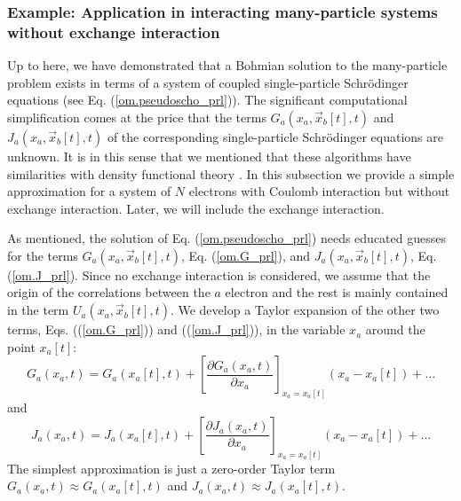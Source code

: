 \documentclass[onecolumn,nofootinbib, secnumarabic, amsmath, nobibnotes,12pt,aps,pra]{revtex4-1}
\newcommand{\pref}[1]{(\ref{#1})}
\newcommand{\eref}[1]{Eq. (\ref{#1})}
\begin{document}
\subsubsection{Example: Application in interacting many-particle systems without exchange interaction}

Up to here, we have demonstrated that a Bohmian solution to the
many-particle problem exists in terms of a system of coupled
single-particle Schr\"odinger equations (see
\eref{om.pseudoscho_prl}). The significant computational
simplification comes at the price that the terms
\textit{$G_{a}(x_{a},\vec x_{b}[t],t)$} and
\textit{$J_{a}(x_{a},\vec x_{b}[t],t)$} of the corresponding
single-particle Schr\"odinger equations are unknown. It is in this
sense that we mentioned that these algorithms have similarities with
density functional theory \cite{om.kohn1964,om.kohn1965}. In this
subsection we provide a simple approximation for a system of $N$
electrons with Coulomb interaction but without exchange interaction.
Later, we will include the exchange interaction.

As mentioned, the solution of \eref{om.pseudoscho_prl} needs
educated guesses for the terms \textit{$G_{a}(x_{a},\vec
x_{b}[t],t)$}, \eref{om.G_prl}, and \textit{$J_{a}(x_{a},\vec
x_{b}[t],t)$}, \eref{om.J_prl}. Since no exchange interaction is
considered, we assume that the origin of the correlations between the $a$ electron and the rest is
mainly contained in the term \textit{$U_{a}(x_{a},\vec
x_{b}[t],t)$}. We develop  a Taylor expansion of the other two terms, Eqs.
(\pref{om.G_prl}) and (\pref{om.J_prl}), in the variable $x_a$
around the point $x_a[t]$:
\begin{equation}
\label{om.G_prl_taylor}
G_{a}(x_a,t) = G_{a}(x_a[t],t) + \left[\frac {\partial G_{a}(x_a,t)} {\partial x_a} \right]_{x_a = x_a[t]}(x_a-x_a[t]) + \ldots
\end{equation}
and
\begin{equation}
\label{om.J_prl_taylor}
J_{a}(x_a,t) = J_{a}(x_a[t],t) + \left[\frac {\partial J_{a}(x_a,t)} {\partial x_a}\right]_{x_a = x_a[t]} (x_a-x_a[t]) + \ldots
\end{equation}
The simplest approximation is just a zero-order Taylor term \textit{$G_{a}(x_a,t) \approx G_{a}(x_a[t],t)$} and \textit{$J_{a}(x_a,t) \approx J_{a}(x_a[t],t)$}.
\end{document}
